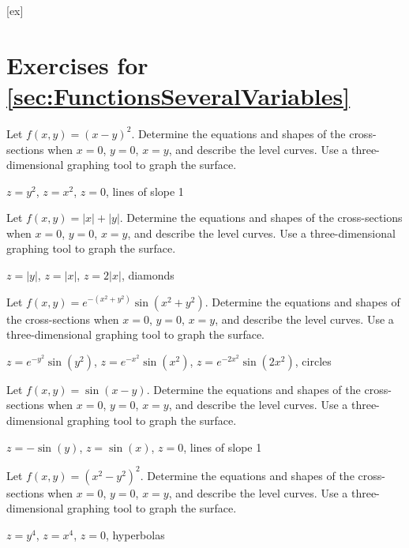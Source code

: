 [ex]
\section*{Exercises for \ref{sec:FunctionsSeveralVariables}}

\begin{enumialphparenastyle}

\begin{ex}
Let $f(x,y)=(x-y)^2$. 
Determine the equations and shapes of the cross-sections when
$x=0$, $y=0$, $x=y$, and describe the level curves.
Use a three-dimensional graphing tool to graph the surface.
\begin{sol}
$z=y^2$, $z=x^2$, $z=0$, lines of slope 1
\end{sol}
\end{ex}

\begin{ex}
Let $f(x,y)=|x|+|y|$. 
Determine the equations and shapes of the cross-sections when
$x=0$, $y=0$, $x=y$, and describe the level curves.
Use a three-dimensional graphing tool to graph the surface.
\begin{sol}
$z=|y|$, $z=|x|$, $z=2|x|$, diamonds
\end{sol}
\end{ex}

\begin{ex}
Let $f(x,y)=e^{-(x^2+y^2)}\sin(x^2+y^2)$. 
Determine the equations and shapes of the cross-sections when
$x=0$, $y=0$, $x=y$, and describe the level curves.
Use a three-dimensional graphing tool to graph the surface.
\begin{sol}
$z=e^{-y^2}\sin(y^2)$, $z=e^{-x^2}\sin(x^2)$, 
$z=e^{-2x^2}\sin(2x^2)$, circles
\end{sol}
\end{ex}

\begin{ex}
Let $f(x,y)=\sin(x-y)$. 
Determine the equations and shapes of the cross-sections when
$x=0$, $y=0$, $x=y$, and describe the level curves.
Use a three-dimensional graphing tool to graph the surface.
\begin{sol}
$z=-\sin(y)$, $z=\sin(x)$, 
$z=0$, lines of slope 1
\end{sol}
\end{ex}

\begin{ex}
Let $f(x,y)=(x^2-y^2)^2$. 
Determine the equations and shapes of the cross-sections when
$x=0$, $y=0$, $x=y$, and describe the level curves.
Use a three-dimensional graphing tool to graph the surface.
\begin{sol}
$z=y^4$, $z=x^4$, 
$z=0$, hyperbolas
\end{sol}
\end{ex}


\end{enumialphparenastyle}
